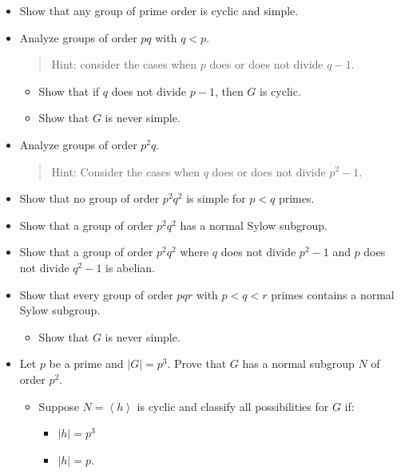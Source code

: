 \begin{itemize}
\item
  Show that any group of prime order is cyclic and simple.
\item
  Analyze groups of order \(pq\) with \(q<p\).

  \begin{quote}
  Hint: consider the cases when \(p\) does or does not divide \(q-1\).
  \end{quote}

  \begin{itemize}
  \tightlist
  \item
    Show that if \(q\) does not divide \(p-1\), then \(G\) is cyclic.
  \item
    Show that \(G\) is never simple.
  \end{itemize}
\item
  Analyze groups of order \(p^2 q\).

  \begin{quote}
  Hint: Consider the cases when \(q\) does or does not divide
  \(p^2 - 1\).
  \end{quote}
\item
  Show that no group of order \(p^2 q^2\) is simple for \(p<q\) primes.
\item
  Show that a group of order \(p^2 q^2\) has a normal Sylow subgroup.
\item
  Show that a group of order \(p^2 q^2\) where \(q\) does not divide
  \(p^2-1\) and \(p\) does not divide \(q^2-1\) is abelian.
\item
  Show that every group of order \(pqr\) with \(p<q<r\) primes contains
  a normal Sylow subgroup.

  \begin{itemize}
  \tightlist
  \item
    Show that \(G\) is never simple.
  \end{itemize}
\item
  Let \(p\) be a prime and \({\left\lvert {G} \right\rvert} = p^3\).
  Prove that \(G\) has a normal subgroup \(N\) of order \(p^2\).

  \begin{itemize}
  \tightlist
  \item
    Suppose \(N = \left\langle{h}\right\rangle\) is cyclic and classify
    all possibilities for \(G\) if:

    \begin{itemize}
    \tightlist
    \item
      \({\left\lvert {h} \right\rvert} = p^3\)
    \item
      \({\left\lvert {h} \right\rvert} = p\).
    \end{itemize}


\end{itemize}
\end{itemize}
